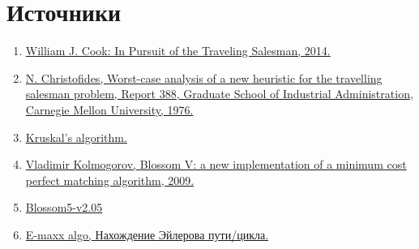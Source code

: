 \documentclass[14pt]{article}
\begin{document}
	
	
	
	\section{Источники}
	 	\begin{enumerate}
	 		\item \label{book1} \href{https://press.princeton.edu/titles/9531.html}{William J. Cook: In Pursuit of the Traveling Salesman, 2014.}
	 		\item \label{algoChrist} \href{https://pdfs.semanticscholar.org/afcb/c048ba3265e04b32f92f9ffec0ff4a110aeb.pdf}{ N. Christofides, Worst-case analysis of a new heuristic for the travelling salesman problem, Report 388, Graduate School of Industrial Administration, Carnegie Mellon University, 1976.} 
	 		\item \label{Kruskal} \href{https://en.wikipedia.org/wiki/Kruskal\%27s_algorithm}{Kruskal's algorithm.}
	 		\item \label{kolm} \href{https://link.springer.com/content/pdf/10.1007\%2Fs12532-009-0002-8.pdf}{Vladimir Kolmogorov, Blossom V: a new implementation of a minimum cost perfect matching algorithm, 2009.}
	 		\item \label{realisation} \href{http://pub.ist.ac.at/~vnk/software/blossom5-v2.05.src.tar.gz}{Blossom5-v2.05}
	 		\item \label{euler} \href{http://e-maxx.ru/algo/euler_path}{E-maxx algo, Нахождение Эйлерова пути/цикла.}
	 	\end{enumerate}
	 	
	 
   
\end{document}
